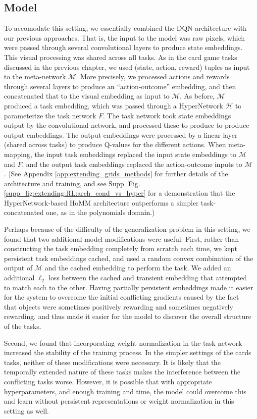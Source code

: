 \subsection{Model}
To accomodate this setting, we essentially combined the DQN architecture \citep{Mnih2015} with our previous approaches. That is, the input to the model was raw pixels, which were passed through several convolutional layers to produce state embeddings. This visual processing was shared across all tasks. As in the card game tasks discussed in the previous chapter, we used (state, action, reward) tuples as input to the meta-network \(\mathcal{M}\). More precisely, we processed actions and rewards through several layers to produce an ``action-outcome'' embedding, and then concatenated that to the visual embedding as input to \(\mathcal{M}\). As before, \(\mathcal{M}\) produced a task embedding, which was passed through a HyperNetwork \(\mathcal{H}\) to parameterize the task network \(F\). The task network took state embeddings output by the convolutional network, and processed these to produce to produce output embeddings. The output embeddings were processed by a linear layer (shared across tasks) to produce Q-values for the different actions. When meta-mapping, the input task embeddings replaced the input state embeddings to \(\mathcal{M}\) and \(F\), and the output task embeddings replaced the action-outcome inputs to \(\mathcal{M}\). (See Appendix \ref{app:extending_grids_methods} for further details of the architecture and training, and see Supp. Fig. \ref{supp_fig:extending:RL:arch_cond_vs_hyper} for a demonstration that the HyperNetwork-based HoMM architecture outperforms a simpler task-concatenated one, as in the polynomials domain.)\par 
Perhaps because of the difficulty of the generalization problem in this setting, we found that two additional model modifications were useful. First, rather than constructing the task embedding completely from scratch each time, we kept persistent task embeddings cached, and used a random convex combination of the output of \(\mathcal{M}\) and the cached embedding to perform the task. We added an additional \(\ell_2\) loss between the cached and transient embedding that attempted to match each to the other. Having partially persistent embeddings made it easier for the system to overcome the initial conflicting gradients caused by the fact that objects were sometimes positively rewarding and sometimes negatively rewarding, and thus made it easier for the model to discover the overall structure of the tasks. \par
Second, we found that incorporating weight normalization \citep{Salimans2016} in the task network increased the stability of the training process. In the simpler settings of the cards tasks, neither of these modifications were necessary. It is likely that the temporally extended nature of these tasks makes the interference between the conflicting tasks worse. However, it is possible that with appropriate hyperparameters, and enough training and time, the model could overcome this and learn without persistent representations or weight normalization in this setting as well. \par 

